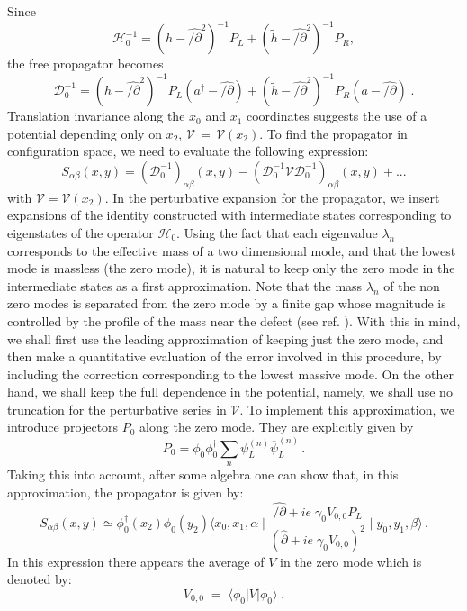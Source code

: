 \documentclass[a4paper,12pt]{article}
\begin{document}
{{Since
\begin{equation}
{\mathcal H}_0 ^{-1}=
(h - \widehat{/\!\!\!\partial}^2)^{-1} P_L + (\tilde{h} - \widehat{/\!\!\!\partial}^2)^{-1} P_R ,
\end{equation}
the free propagator becomes
\begin{equation}
   \label{Ddeop}
{\mathcal D}_0 ^{-1}= (h - \widehat{/\!\!\!\partial}^2)^{-1} P_L
(a^{\dagger} - \widehat{/\!\!\!\partial}) + (\tilde{h} -
\widehat{/\!\!\!\partial}^2)^{-1} P_R (a - \widehat{/\!\!\!\partial}) \;.
\end{equation}
Translation invariance along the $x_0$ and $x_1$ coordinates suggests
the use of a potential depending only on $x_2$, ${\mathcal
  V}\,=\,{\mathcal V}(x_2)$.  To find the propagator in configuration
space, we need to evaluate the following expression:
\begin{equation}
S_{\alpha\beta}(x,y)=({\mathcal D}_0 ^{-1})_{\alpha\beta}(x,y)-({\mathcal D}_0 ^{-1}{\mathcal V}
{\mathcal D}_0 ^{-1})_{\alpha\beta}(x,y) + ...
\end{equation}
with ${\mathcal V}={\mathcal V}(x_2)$. In the perturbative expansion
for the propagator, we insert expansions of the identity constructed
with intermediate states corresponding to eigenstates of the operator
${\mathcal H}_0$. Using the fact that each eigenvalue $\lambda_n$
corresponds to the effective mass of a two dimensional mode, and that
the lowest mode is massless (the zero mode), it is natural to keep
only the zero mode in the intermediate states as a first
approximation. Note that the mass $\lambda_n$ of the non zero modes is
separated from the zero mode by a finite gap whose magnitude is
controlled by the profile of the mass near the defect (see ref.
\cite{p1}). With this in mind, we shall first use the leading
approximation of keeping just the zero mode, and then make a
quantitative evaluation of the error involved in this procedure, by
including the correction corresponding to the lowest massive mode. On
the other hand, we shall keep the full dependence in the potential,
namely, we shall use no truncation for the perturbative series in
${\mathcal V}$.  To implement this approximation, we introduce
projectors $P_0$ along the zero mode. They are explicitly given by
\begin{equation}
P_0 = \phi_0 \phi_0^{\dagger} \sum_n \psi_L^{(n)} \overline{\psi}_L^{(n)}\,.
\end{equation}
Taking this into account, after some algebra one can show that, in
this approximation, the propagator is given by:
\begin{equation}
S_{\alpha\beta}(x,y) \simeq \phi^{\dagger}_0(x_2)\phi_0(y_2)   \langle x_0,x_1,\alpha \mid \frac{\widehat{/\!\!\!\partial} +
ie\;\gamma_0 V_{0,0} P_L}{(\widehat{\partial} + ie\;\gamma_0 V_{0,0})^2}\mid y_0,y_1, \beta \rangle\,.
\end{equation}
In this expression there appears the average of $V$ in the zero mode
which is denoted by:
\begin{equation}
V_{0,0}\;=\;\langle \phi_0 | V | \phi_0 \rangle\;.
\end{equation}

}}
\end{document}
